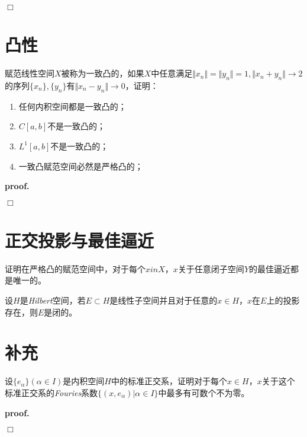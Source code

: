 $\Box$

\section{凸性}

\begin{mdframed}
    \begin{question}
        赋范线性空间$X$被称为一致凸的，如果$X$中任意满足$\Vert x_n\Vert=\Vert y_n\Vert=1,\Vert x_n+y_n\Vert\rightarrow 2$的序列$\{x_n\},\{y_n\}$有$\Vert x_n-y_n\Vert\rightarrow 0$，证明：
        \begin{enumerate}[itemindent=2em]
            \item 任何内积空间都是一致凸的；
            \item $C[a,b]$不是一致凸的；
            \item $L^1[a,b]$不是一致凸的；
            \item 一致凸赋范空间必然是严格凸的；
        \end{enumerate}
    \end{question}
\end{mdframed}

\textbf{proof.}

$\Box$

\section{正交投影与最佳逼近}

\begin{mdframed}
    \begin{question}
        证明在严格凸的赋范空间中，对于每个$xin X$，$x$关于任意闭子空间$Y$的最佳逼近都是唯一的。
    \end{question}
\end{mdframed}

\begin{mdframed}
    \begin{question}
        设$H$是\textsl{Hilbert}空间，若$E\subset H$是线性子空间并且对于任意的$x\in H$，$x$在$E$上的投影存在，则$E$是闭的。
    \end{question}
\end{mdframed}

\section{补充}

\begin{mdframed}
    \begin{question}
        设$\{e_\alpha\}(\alpha\in I)$是内积空间$H$中的标准正交系，证明对于每个$x\in H$，$x$关于这个标准正交系的\textsl{Fouries}系数$\{(x,e_\alpha)|\alpha\in I\}$中最多有可数个不为零。
    \end{question}
\end{mdframed}

\textbf{proof.}

$\Box$